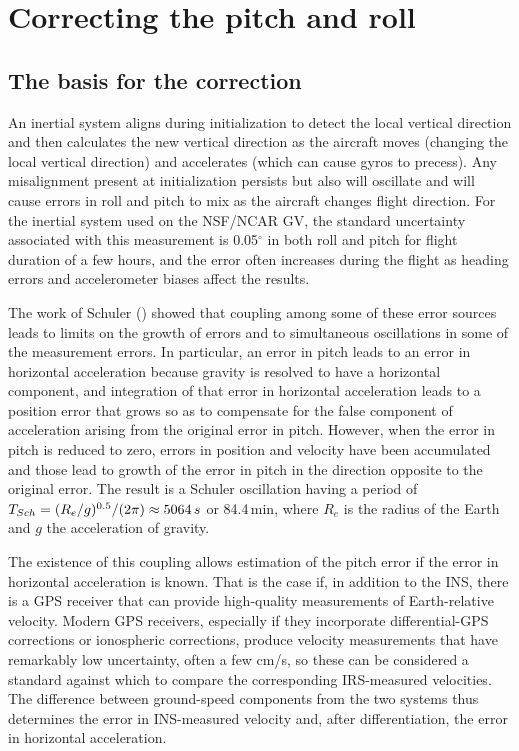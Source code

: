 \documentclass[english,british,amtd,bookmarks=false,unicode=true]{copernicus}\usepackage[]{graphicx}\usepackage[]{color}
\begin{document}
\section{Correcting the pitch and roll\label{sec:Correcting-the-pitch}}


\subsection{The basis for the correction\label{sub:Sect2.1}}

An inertial system aligns during initialization to detect the local
vertical direction and then calculates the new vertical direction
as the aircraft moves (changing the local vertical direction) and
accelerates (which can cause gyros to precess). Any misalignment present
at initialization persists but also will oscillate and will cause
errors in roll and pitch to mix as the aircraft changes flight direction.
For the inertial system used on the NSF/NCAR GV, the standard uncertainty
associated with this measurement is 0.05$^{\circ}$ in both roll and
pitch for flight duration of a few hours, and the error often increases
during the flight as heading errors and accelerometer biases affect
the results. 

The work of Schuler (\citet{Schuler1923}) showed that coupling among
some of these error sources leads to limits on the growth of errors
and to simultaneous oscillations in some of the measurement errors.
In particular, an error in pitch leads to an error in horizontal acceleration
because gravity is resolved to have a horizontal component, and integration
of that error in horizontal acceleration leads to a position error
that grows so as to compensate for the false component of acceleration
arising from the original error in pitch. However, when the error
in pitch is reduced to zero, errors in position and velocity have
been accumulated and those lead to growth of the error in pitch in
the direction opposite to the original error. The result is a Schuler
oscillation having a period of $T_{Sch}=(R_{e}/g)^{0.5}/(2\pi)\approx5064\thinspace s$
or 84.4\,min, where $R_{e}$ is the radius of the Earth and $g$
the acceleration of gravity. 

The existence of this coupling allows estimation of the pitch error
if the error in horizontal acceleration is known. That is the case
if, in addition to the INS, there is a GPS receiver that can provide
high-quality measurements of Earth-relative velocity. Modern GPS receivers,
especially if they incorporate differential-GPS corrections or ionospheric
corrections, produce velocity measurements that have remarkably low
uncertainty, often a few cm/s, so these can be considered a standard
against which to compare the corresponding IRS-measured velocities.
The difference between ground-speed components from the two systems
thus determines the error in INS-measured velocity and, after differentiation,
the error in horizontal acceleration.
\end{document}
